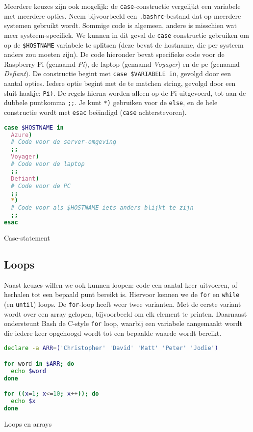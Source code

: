 Meerdere keuzes zijn ook mogelijk: de \texttt{case}-constructie vergelijkt een variabele met meerdere opties. Neem bijvoorbeeld een \texttt{.bashrc}-bestand dat op meerdere systemen gebruikt wordt. Sommige code is algemeen, andere is misschien wat meer systeem-specifiek. We kunnen in dit geval de \texttt{case} constructie gebruiken om op de \texttt{\$HOSTNAME} variabele te splitsen (deze bevat de hostname, die per systeem anders zou moeten zijn). De code hieronder bevat specifieke code voor de Raspberry Pi (genaamd \emph{Pi}), de laptop (genaamd \emph{Voyager}) en de pc (genaamd \emph{Defiant}). De constructie begint met \texttt{case\ \$VARIABELE\ in}, gevolgd door een aantal opties. Iedere optie begint met de te matchen string, gevolgd door een sluit-haakje: \texttt{Pi)}. De regels hierna worden alleen op de Pi uitgevoerd, tot aan de dubbele puntkomma \texttt{;;}. Je kunt \texttt{*)} gebruiken voor de \texttt{else}, en de hele constructie wordt met \texttt{esac} beëindigd (\texttt{case} achterstevoren).

\begin{listing}
\begin{lstlisting}[language=bash]
case $HOSTNAME in
  Azure)
  # Code voor de server-omgeving
  ;;
  Voyager)
  # Code voor de laptop
  ;;
  Defiant)
  # Code voor de PC
  ;;
  *)
  # Code voor als $HOSTNAME iets anders blijkt te zijn
  ;;
esac
\end{lstlisting}
\caption{Case-statement}
\end{listing}

\subsection{Loops}\label{loops}

Naast keuzes willen we ook kunnen loopen: code een aantal keer uitvoeren, of herhalen tot een bepaald punt bereikt is. Hiervoor kennen we de \texttt{for} en \texttt{while} (en \texttt{until}) loops. De \texttt{for}-loop heeft weer twee varianten. Met de eerste variant wordt over een array gelopen, bijvoorbeeld om elk element te printen. Daarnaast ondersteunt Bash de C-style \texttt{for} loop, waarbij een variabele aangemaakt wordt die iedere keer opgehoogd wordt tot een bepaalde waarde wordt bereikt.

\begin{listing}
\begin{lstlisting}[language=bash]
declare -a ARR=('Christopher' 'David' 'Matt' 'Peter' 'Jodie')

for word in $ARR; do
  echo $word 
done

for ((x=1; x<=10; x++)); do 
  echo $x
done
\end{lstlisting}
\caption{Loops en arrays}
\end{listing}

